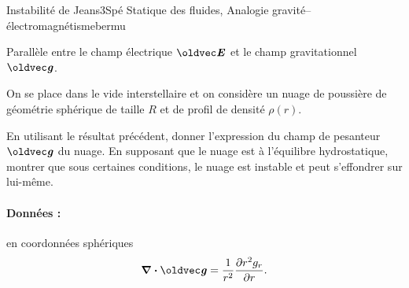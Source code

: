 
\begin{exercise}{Instabilité de Jeans}{3}{Spé}
{Statique des fluides, Analogie gravité--électromagnétisme}{bermu}

\begin{questions}
    \questioncours Parallèle entre le champ électrique $\vE$ et le champ gravitationnel $\vg$.
\begin{EnvUplevel}
On se place dans le vide interstellaire et on considère un nuage de poussière de géométrie sphérique de taille $R$ et de profil de densité $\rho(r)$.
\end{EnvUplevel}
    \question En utilisant le résultat précédent, donner l'expression du champ de pesanteur $\vg$ du nuage.
    \question En supposant que le nuage est à l'équilibre hydrostatique, montrer que sous certaines conditions, le nuage est instable et peut s'effondrer sur lui-même.
\end{questions}

\paragraph{Données :} en coordonnées sphériques
$$\div\vg = \dfrac{1}{r^2}\pdv{r^2 g_r}{r}.$$
\end{exercise}
